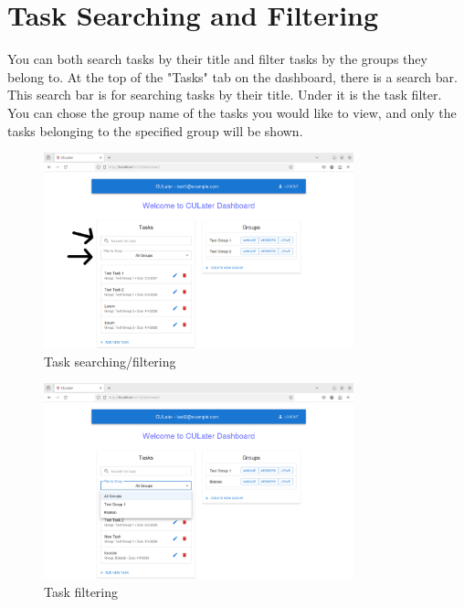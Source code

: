 \documentclass{scrreprt}
\begin{document}
\chapter{Task Searching and Filtering}

You can both search tasks by their title and filter tasks by the groups they belong to. At the top of the "Tasks" tab on the dashboard, there is a search bar. This search bar is for searching tasks by their title. Under it is the task filter. You can chose the group name of the tasks you would like to view, and only the tasks belonging to the specified group will be shown.
\begin{figure}[htbp]
        \centering
        \includegraphics[width=0.8\textwidth]{filter_and_search.png}
	\caption{Task searching/filtering}
	\label{fig:my_label}
\end{figure}
\begin{figure}[htbp]
        \centering
        \includegraphics[width=0.8\textwidth]{filtering.png}
	\caption{Task filtering}
	\label{fig:my_label}
\end{figure}
\end{document}
